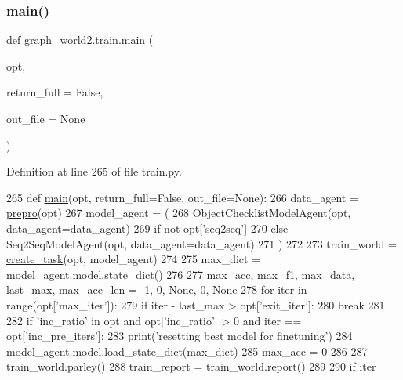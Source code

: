 \subsubsection{\texorpdfstring{main()}{main()}}
{\footnotesize\ttfamily def graph\+\_\+world2.\+train.\+main (\begin{DoxyParamCaption}\item[{}]{opt,  }\item[{}]{return\+\_\+full = {\ttfamily False},  }\item[{}]{out\+\_\+file = {\ttfamily None} }\end{DoxyParamCaption})}



Definition at line 265 of file train.\+py.


\begin{DoxyCode}
265 \textcolor{keyword}{def }\hyperlink{namespacegraph__world2_1_1train_af3dec887619817c1a7a38930ffcfd1cb}{main}(opt, return\_full=False, out\_file=None):
266     data\_agent = \hyperlink{namespacegraph__world2_1_1train_ac238655ccbc748146d1cbaaac96433a5}{prepro}(opt)
267     model\_agent = (
268         ObjectChecklistModelAgent(opt, data\_agent=data\_agent)
269         \textcolor{keywordflow}{if} \textcolor{keywordflow}{not} opt[\textcolor{stringliteral}{'seq2seq'}]
270         \textcolor{keywordflow}{else} Seq2SeqModelAgent(opt, data\_agent=data\_agent)
271     )
272 
273     train\_world = \hyperlink{namespaceparlai_1_1core_1_1worlds_a11923c10b545c7ecc1b08fe2242d9c2c}{create\_task}(opt, model\_agent)
274 
275     max\_dict = model\_agent.model.state\_dict()
276 
277     max\_acc, max\_f1, max\_data, last\_max, max\_acc\_len = -1, 0, \textcolor{keywordtype}{None}, 0, \textcolor{keywordtype}{None}
278     \textcolor{keywordflow}{for} iter \textcolor{keywordflow}{in} range(opt[\textcolor{stringliteral}{'max\_iter'}]):
279         \textcolor{keywordflow}{if} iter - last\_max > opt[\textcolor{stringliteral}{'exit\_iter'}]:
280             \textcolor{keywordflow}{break}
281 
282         \textcolor{keywordflow}{if} \textcolor{stringliteral}{'inc\_ratio'} \textcolor{keywordflow}{in} opt \textcolor{keywordflow}{and} opt[\textcolor{stringliteral}{'inc\_ratio'}] > 0 \textcolor{keywordflow}{and} iter == opt[\textcolor{stringliteral}{'inc\_pre\_iters'}]:
283             print(\textcolor{stringliteral}{'resetting best model for finetuning'})
284             model\_agent.model.load\_state\_dict(max\_dict)
285             max\_acc = 0
286 
287         train\_world.parley()
288         train\_report = train\_world.report()
289 
290         \textcolor{keywordflow}{if} iter %

\end{DoxyCode}
